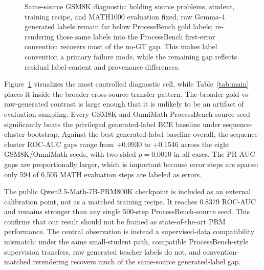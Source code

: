 \documentclass{article}
\begin{document}
\begin{figure}[t]
\centering
{}
\caption{Same-source GSM8K diagnostic: holding source problems, student, training recipe, and MATH1000 evaluation fixed, raw Gemma-4 generated labels remain far below ProcessBench gold labels; re-rendering those same labels into the ProcessBench first-error convention recovers most of the no-GT gap. This makes label convention a primary failure mode, while the remaining gap reflects residual label-content and provenance differences.}
\label{fig:main-roc}
\end{figure}

Figure~\ref{fig:main-roc} visualizes the most controlled diagnostic cell, while Table~\ref{tab:main} places it inside the broader cross-source transfer pattern.
The broader gold-vs-raw-generated contrast is large enough that it is unlikely to be an artifact of evaluation sampling.
Every GSM8K and OmniMath ProcessBench-source seed significantly beats the privileged generated-label BCE baseline under sequence-cluster bootstrap.
Against the best generated-label baseline overall, the sequence-cluster ROC-AUC gaps range from +0.0930 to +0.1546 across the eight GSM8K/OmniMath seeds, with two-sided $p=0.0010$ in all cases.
The PR-AUC gaps are proportionally larger, which is important because error steps are sparse: only 594 of 6,505 MATH evaluation steps are labeled as errors.

The public Qwen2.5-Math-7B-PRM800K checkpoint is included as an external calibration point, not as a matched training recipe.
It reaches 0.8379 ROC-AUC and remains stronger than any single 500-step ProcessBench-source seed.
This confirms that our result should not be framed as state-of-the-art PRM performance.
The central observation is instead a supervised-data compatibility mismatch: under the same small-student path, compatible ProcessBench-style supervision transfers, raw generated teacher labels do not, and convention-matched rerendering recovers much of the same-source generated-label gap.
\end{document}
